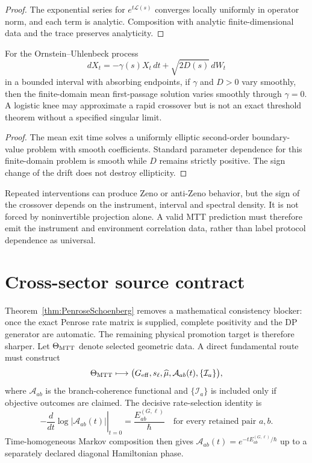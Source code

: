 \documentclass[11pt]{article}
\newcommand{\cL}{\mathcal L}
\begin{document}
\begin{proof}
The exponential series for $e^{t\cL(s)}$ converges locally uniformly in operator
norm, and each term is analytic. Composition with analytic finite-dimensional data
and the trace preserves analyticity.
\end{proof}

\begin{proposition}\label{prop:OU}
For the Ornstein--Uhlenbeck process
\[
 dX_t=-\gamma(s)X_t\,dt+\sqrt{2D(s)}\,dW_t
\]
in a bounded interval with absorbing endpoints, if $\gamma$ and $D>0$ vary smoothly,
then the finite-domain mean first-passage solution varies smoothly through
$\gamma=0$. A logistic knee may approximate a rapid crossover but is not an exact
threshold theorem without a specified singular limit.
\end{proposition}

\begin{proof}
The mean exit time solves a uniformly elliptic second-order boundary-value problem
with smooth coefficients. Standard parameter dependence for this finite-domain
problem is smooth while $D$ remains strictly positive. The sign change of the drift
does not destroy ellipticity.
\end{proof}

Repeated interventions can produce Zeno or anti-Zeno behavior, but the sign of the
crossover depends on the instrument, interval and spectral density. It is not forced
by noninvertible projection alone. A valid MTT prediction must therefore emit the
instrument and environment correlation data, rather than label protocol dependence
as universal.

\section{Cross-sector source contract}

Theorem~\ref{thm:PenroseSchoenberg} removes a mathematical consistency blocker:
once the exact Penrose rate matrix is supplied, complete positivity and the DP
generator are automatic. The remaining physical promotion target is therefore
sharper. Let $\Theta_{\rm MTT}$ denote selected geometric data. A direct fundamental
route must construct
\begin{equation}
 \Theta_{\rm MTT}\longmapsto
 \bigl(G_{\rm eff},s_\ell,\widehat\mu,\mathcal A_{ab}(t),
        \{\mathcal I_a\}\bigr),
 \label{eq:direct-source-map}
\end{equation}
where $\mathcal A_{ab}$ is the branch-coherence functional and
$\{\mathcal I_a\}$ is included only if objective outcomes are claimed. The decisive
rate-selection identity is
\begin{equation}
 -\left.\frac{d}{dt}\log|\mathcal A_{ab}(t)|\right|_{t=0}
 =\frac{E_{ab}^{(G,\ell)}}{\hbar}
 \quad\text{for every retained pair }a,b.
 \label{eq:rate-selection-target}
\end{equation}
Time-homogeneous Markov composition then gives
$\mathcal A_{ab}(t)=e^{-tE_{ab}^{(G,\ell)}/\hbar}$ up to a separately declared
diagonal Hamiltonian phase.
\end{document}
